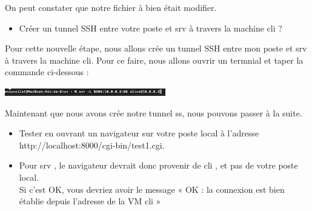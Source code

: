 \documentclass[12pt]{article}
\begin{document}
\vspace{0.3cm}

On peut constater que notre fichier à bien était modifier.

\newpage

\vspace{0.3cm}

\begin{itemize}
  \item Créer un tunnel SSH entre votre poste et srv à travers la machine cli ?
\end{itemize}

\vspace{0.3cm}

Pour cette nouvelle étape, nous allons crée un tunnel SSH entre mon poste et srv à travers la machine cli. Pour ce faire, nous allons ouvrir un termnial et taper la commande ci-dessous : 

\vspace{0.3cm}

\begin{center}
  \includegraphics[width=7cm]{Image-TD-SSH-5/port-local.png}
\end{center}

\vspace{0.3cm}

Maintenant que nous avons crée notre tunnel ss, nous pouvons passer à la suite.

\vspace{0.3cm}

\begin{itemize}
  \item Tester en ouvrant un navigateur sur votre poste local à l'adresse http://localhost:8000/cgi-bin/test1.cgi.
\end{itemize}

\vspace{0.3cm}

\begin{itemize}
  \item Pour srv , le navigateur devrait donc provenir de cli , et pas de votre poste local. \\
  Si c'est OK, vous devriez avoir le message « OK : la connexion est bien établie depuis l’adresse de la VM cli »
\end{itemize}

\vspace{0.3cm}
\end{document}

